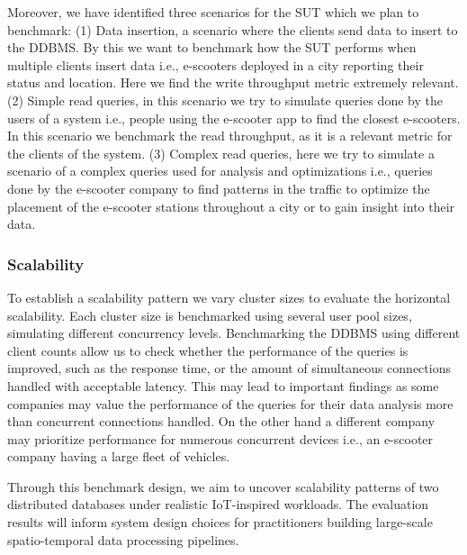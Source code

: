 Moreover, we have identified three scenarios for the SUT which we plan to benchmark:
(1) Data insertion, a scenario where the clients send data to insert to the DDBMS.
By this we want to benchmark how the SUT performs when multiple clients insert data i.e., e-scooters deployed in a city reporting their status and location.
Here we find the write throughput metric extremely relevant.
(2) Simple read queries, in this scenario we try to simulate queries done by the users of a system i.e., people using the e-scooter app to find the closest e-scooters.
In this scenario we benchmark the read throughput, as it is a relevant metric for the clients of the system.
(3) Complex read queries, here we try to simulate a scenario of a complex queries used for analysis and optimizations i.e., queries done by the e-scooter company to find patterns in the traffic to optimize the placement of the e-scooter stations throughout a city or to gain insight into their data.

\subsubsection{Scalability}
To establish a scalability pattern we vary cluster sizes to evaluate the horizontal scalability.
Each cluster size is benchmarked using several user pool sizes, simulating different concurrency levels.
Benchmarking the DDBMS using different client counts allow us to check whether the performance of the queries is improved, such as the response time, or the amount of simultaneous connections handled with acceptable latency.
This may lead to important findings as some companies may value the performance of the queries for their data analysis more than concurrent connections handled.
On the other hand a different company may prioritize performance for numerous concurrent devices i.e., an e-scooter company having a large fleet of vehicles.

Through this benchmark design, we aim to uncover scalability patterns of two distributed databases under realistic IoT-inspired workloads.
The evaluation results will inform system design choices for practitioners building large-scale spatio-temporal data processing pipelines.
